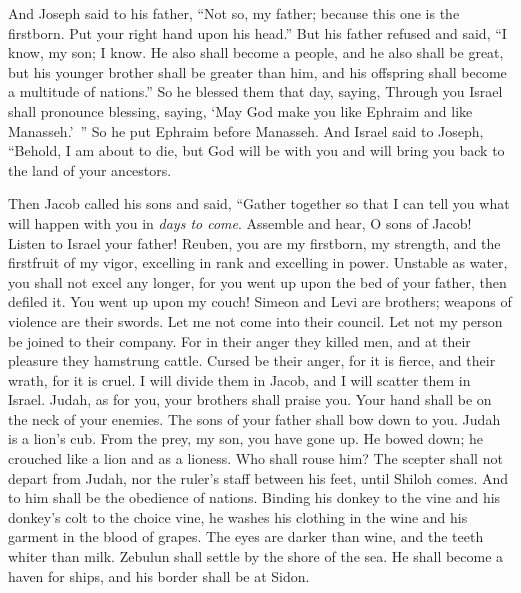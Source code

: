 \begin{biblechapter}
\verse And Joseph said to his father, “Not so, my father; because this one is the firstborn. Put your right hand upon his head.”
\verse But his father refused and said, “I know, my son; I know. He also shall become a people, and he also shall be great, but his younger brother shall be greater than him, and his offspring shall become a multitude of nations.”
\verse So he blessed them that day, saying, Through you Israel shall pronounce blessing, saying, 
‘May God make you like Ephraim and like Manasseh.’ ”
\verse So he put Ephraim before Manasseh.
\verse And Israel said to Joseph, “Behold, I am about to die, but God will be with you and will bring you back to the land of your ancestors.
\end{biblechapter}

\begin{biblechapter} %
 Then Jacob called his sons and said, “Gather together so that I can tell you what will happen with you in \textit{days to come}.
\verse Assemble and hear, O sons of Jacob! 
Listen to Israel your father!
\verse Reuben, you are my firstborn, 
my strength, and the firstfruit of my vigor, 
excelling in rank and excelling in power.
\verse Unstable as water, you shall not excel any longer, 
for you went up upon the bed of your father, 
then defiled it. You went up upon my couch!
\verse Simeon and Levi are brothers; 
weapons of violence are their swords. 
Let me not come into their council.
\verse Let not my person be joined to their company. 
For in their anger they killed men, 
and at their pleasure they hamstrung cattle.
\verse Cursed be their anger, for it is fierce, 
and their wrath, for it is cruel. 
I will divide them in Jacob, 
and I will scatter them in Israel.
\verse Judah, as for you, your brothers shall praise you. 
Your hand shall be on the neck of your enemies. 
The sons of your father shall bow down to you.
\verse Judah is a lion’s cub. 
From the prey, my son, you have gone up. 
He bowed down; he crouched like a lion and as a lioness. 
Who shall rouse him?
\verse The scepter shall not depart from Judah, 
nor the ruler’s staff between his feet, 
until Shiloh comes. 
And to him shall be the obedience of nations.
\verse Binding his donkey to the vine 
and his donkey’s colt to the choice vine, 
he washes his clothing in the wine 
and his garment in the blood of grapes.
\verse The eyes are darker than wine, 
and the teeth whiter than milk.
\verse Zebulun shall settle by the shore of the sea. 
He shall become a haven for ships, 
and his border shall be at Sidon.

\end{biblechapter}
